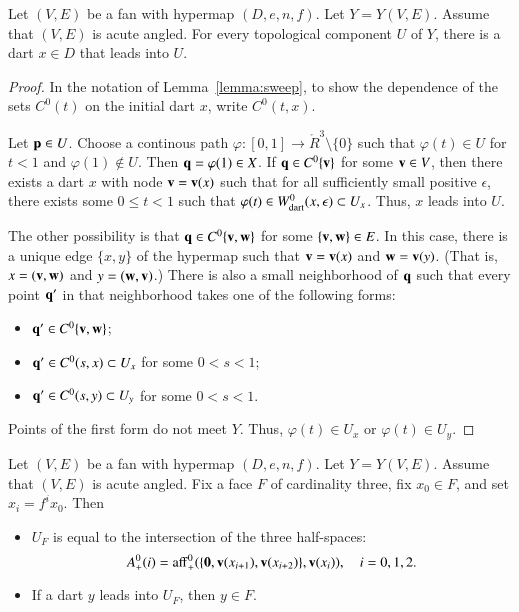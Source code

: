 \begin{lemma}\label{lemma:lead-exists}
Let $(V,E)$ be a fan with hypermap $(D,e,n,f)$. Let $Y=Y(V,E)$. Assume that $(V,E)$ is acute angled.   For every topological component $U$ of $Y$, there is a dart $x\in D$ that leads into $U$.
\end{lemma}
%
%
%

\begin{proof}  
In the notation of Lemma~\ref{lemma:sweep}, to show the dependence of the sets $C^0(t)$ on the initial dart $x$, write $C^0(t,x)$.

Let ${\mathbf p}\in U$.  Choose a continous path $\varphi:[0,1]\to \ring{R}^3\setminus\{0\}$
such that $\varphi(t)\in U$ for $t<1$ and $\varphi(1)\not\in U$.  Then
${\mathbf q}=\varphi(1)\in X$.  If ${\mathbf q}\in C^0\{{\mathbf v}\}$ for some ${\mathbf v}\in V$,
then there exists a dart $x$ with node ${\mathbf v} = {\mathbf v}(x)$ such that for all sufficiently small positive $\epsilon$, there exists some $0\le t < 1$ such that  $\varphi(t)\in W^0_{\text{dart}}(x,\epsilon)\subset U_x$.  
Thus, $x$ leads into $U$.
%

The other possibility is that
${\mathbf q}\in C^0\{{\mathbf v},{\mathbf w}\}$ for some $\{{\mathbf v},{\mathbf w}\}\in E$.  In this case, there is a unique
edge $\{x,y\}$ of the hypermap such that ${\mathbf v}={\mathbf v}(x)$ and ${\mathbf w}={\mathbf v}(y)$.   (That is, $x=({\mathbf v},{\mathbf w})$ and $y=({\mathbf w},{\mathbf v})$.)
There
is also a small neighborhood of ${\mathbf q}$ such that every point ${\mathbf q}'$ in that neighborhood
takes one of the following forms:
\begin{itemize} \item ${\mathbf q}'\in C^0\{{\mathbf v},{\mathbf w}\}$;
\item ${\mathbf q}'\in C^0(s,x)\subset U_x$ for some $0<s<1$;
\item ${\mathbf q}'\in C^0(s,y)\subset U_y$ for some $0<s<1$.
\end{itemize}
Points of the first form do not meet $Y$.  Thus,  $\varphi(t)\in U_x$ or $\varphi(t)\in U_y$.  
\end{proof}

\begin{lemma} \label{lemma:triangle}
Let $(V,E)$ be a fan with hypermap $(D,e,n,f)$. 
Let $Y=Y(V,E)$.
Assume that $(V,E)$ is acute angled. Fix a face $F$ of cardinality three, fix
$x_0\in F$, and set $x_i = f^i x_0$. Then
%
\begin{itemize}  
\item $U_F$ is equal to the intersection of the three half-spaces:
$$A^0_+(i)={\operatorname{aff}}_+^0(\{{\mathbf 0},{\mathbf v}(x_{i+1}),{\mathbf v}(x_{i+2})\},{\mathbf v}(x_i)),\quad i=0,1,2.$$
\item If a dart $y$ leads into $U_F$, then $y\in F$.
\end{itemize}
\end{lemma}
%

